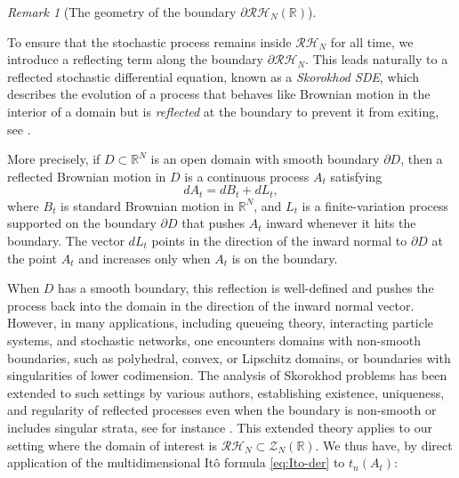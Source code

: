 \documentclass[12pt,reqno]{amsart}
\theoremstyle{plain}
\theoremstyle{definition}
\theoremstyle{remark}
\newtheorem{rem}{Remark}[section]       %
\begin{document}
\begin{rem}[The geometry of the boundary \( \partial \mathcal{RH}_N (\mathbb{R}) \)]
\end{rem}


To ensure that the stochastic process remains inside $\mathcal{RH}_N $ for all time, we introduce a reflecting term along the boundary $\partial \mathcal{RH}_N$. This leads naturally to a reflected stochastic differential equation, known as a \emph{Skorokhod SDE}, which describes the evolution of a process that behaves like Brownian motion in the interior of a domain but is \emph{reflected} at the boundary to prevent it from exiting, see \cite{Skorokhod1961,Skorokhod1962,Tanaka1979,
LionsSznitman1984,IkedaWatanabe1981}.

More precisely, if $D \subset \mathbb{R}^N$ is an open domain with smooth boundary $\partial D$, then a reflected Brownian motion in $D$ is a continuous process $A_t$ satisfying
\begin{equation}
dA_t = dB_t + dL_t,
\end{equation}
where $B_t$ is standard Brownian motion in $\mathbb{R}^N$, and $L_t$ is a finite-variation process supported on the boundary $\partial D$ that pushes $A_t$ inward whenever it hits the boundary. The vector $dL_t$ points in the direction of the inward normal to $\partial D$ at the point $A_t$ and increases only when $A_t$ is on the boundary. 

When $D$ has a smooth boundary, this reflection is well-defined and pushes the process back into the domain in the direction of the inward normal vector. 
However, in many applications, including queueing theory, interacting particle systems, and stochastic networks, one encounters domains with non-smooth boundaries, such as polyhedral, convex, or Lipschitz domains, or boundaries with singularities of lower codimension. The analysis of Skorokhod problems has been extended to such settings by various authors, establishing existence, uniqueness, and regularity of reflected processes even when the boundary is non-smooth or includes singular strata, see for instance \cite{Saisho1987, DupuisIshii1991, Williams1995, DaiWilliams1995, BurdzyChenSylvester2004, Grabiner1999}. This extended theory applies to our setting where the domain of interest is $\mathcal{RH}_N \subset \mathcal{Z}_N(\mathbb{R})$. We thus have, by direct application of the multidimensional Itô formula \eqref{eq:Ito-der} to $t_n(A_t)$:
\end{document}
